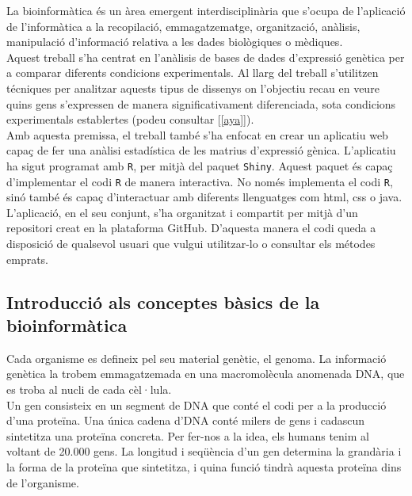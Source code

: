 \documentclass[english]{article}
\begin{document}
La bioinformàtica és un àrea emergent interdisciplinària que s'ocupa de l'aplicació de l'informàtica a la recopilació, emmagatzematge, organització, anàlisis, manipulació d'informació relativa a les dades biològiques o mèdiques.
\\

Aquest treball s'ha centrat en l'anàlisis de bases de dades d'expressió genètica per a comparar diferents condicions experimentals. Al llarg del treball s'utilitzen técniques per analitzar aquests tipus de dissenys on l'objectiu recau en veure quins gens s'expressen de manera significativament diferenciada, sota condicions experimentals establertes (podeu consultar [\ref{aya}]).
\\

Amb aquesta premissa, el treball també s'ha enfocat en crear un aplicatiu web capaç de fer una anàlisi estadística de les matrius d'expressió gènica. L'aplicatiu ha sigut programat amb \texttt{R}, per mitjà del paquet \texttt{Shiny}. Aquest paquet és capa\c{c} d'implementar el codi \texttt{R} de manera interactiva. No només implementa el codi \texttt{R}, sinó també és capaç d'interactuar amb diferents llenguatges com html, css o java. L'aplicació, en el seu conjunt, s'ha organitzat i compartit per mitjà d'un repositori creat en la plataforma GitHub. D'aquesta manera el codi queda a disposició de qualsevol usuari que vulgui utilitzar-lo o consultar els métodes emprats.

\subsection{Introducció als conceptes bàsics de la bioinformàtica}
\label{1.1}

Cada organisme es defineix pel seu material genètic, el genoma. La informació genètica la trobem emmagatzemada en una macromolècula anomenada DNA, que es troba al nucli de cada cèl·lula.
\\

Un gen consisteix en un segment de DNA que conté el codi per a la producció d'una proteïna. Una única cadena d'DNA conté milers de gens i cadascun sintetitza una proteïna concreta. Per fer-nos a la idea, els humans tenim al voltant de 20.000 gens. La longitud i seqüència d'un gen determina la grandària i la forma de la proteïna que sintetitza, i quina funció tindrà aquesta proteïna dins de l'organisme.
\\
\end{document}
